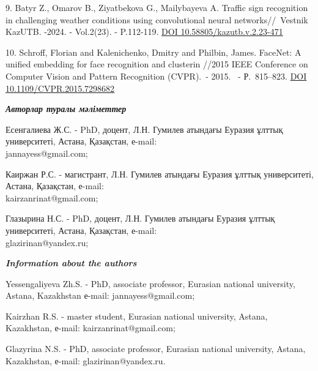 \begin{references}
9. Batyr Z., Omarov B., Ziyatbekova G., Mailybayeva A. Traffic sign
recognition in challenging weather conditions using convolutional neural
networks//~Vestnik KazUTB. -2024. - Vol.2(23). - P.112-119.
\href{https://doi.org/10.58805/kazutb.v.2.23-471}{DOI
10.58805/kazutb.v.2.23-471}

10. Schroff, Florian and Kalenichenko, Dmitry and Philbin, James.
FaceNet: A unified embedding for face recognition and clusterin //2015
IEEE Conference on Computer Vision and Pattern Recognition (CVPR).~-
2015. ~- Р.~815--823.
\href{https://doi.org/10.1109/CVPR.2015.7298682}{DOI
10.1109/CVPR.2015.7298682}
\end{references}

\begin{authorinfo}
\hspace{1em}\emph{{\bfseries Авторлар туралы мәліметтер}}

Есенгалиева Ж.С. - PhD, доцент, Л.Н. Гумилев атындағы Еуразия ұлттық
университеті, Астана, Қазақстан, е-mail: \\jannayess@gmail.com;

Каиржан Р.С. - магистрант, Л.Н. Гумилев атындағы Еуразия ұлттық
университеті, Астана, Қазақстан, е-mail: \\kairzanrinat@gmail.com;

Глазырина Н.С. - PhD, доцент, Л.Н. Гумилев атындағы Еуразия ұлттық
университеті, Астана, Қазақстан, е-mail: \\glazirinan@yandex.ru;

\hspace{1em}\emph{{\bfseries Information about the authors}}

Yessengaliyeva Zh.S. - PhD, associate professor, Eurasian national
university, Astana, Kazakhstan е-mail: jannayess@gmail.com;

Kairzhan R.S. - master student, Eurasian national university, Astana,
Kazakhstan, е-mail: kairzanrinat@gmail.com;

Glazyrina N.S. - PhD, associate professor, Eurasian national university,
Astana, Kazakhstan, е-mail: glazirinan@yandex.ru.
\end{authorinfo}

